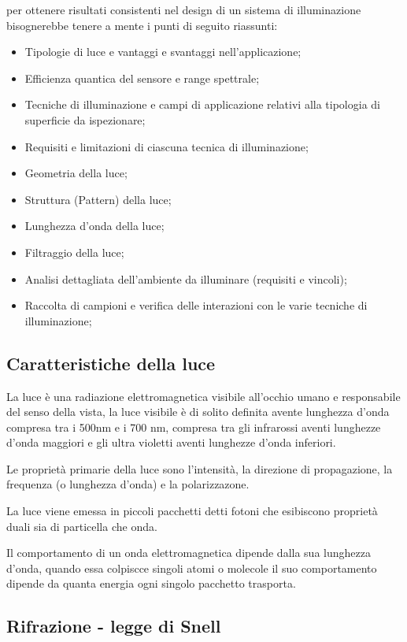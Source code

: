 per ottenere risultati consistenti nel design di un sistema di illuminazione bisognerebbe tenere a mente i punti di seguito riassunti:

\begin{itemize}
	\item Tipologie di luce e vantaggi e svantaggi nell'applicazione;
	\item Efficienza quantica del sensore e range spettrale;
	\item Tecniche di illuminazione e campi di applicazione relativi alla tipologia di superficie da ispezionare;
	\item Requisiti e limitazioni di ciascuna tecnica di illuminazione;
	\item Geometria della luce;
	\item Struttura (Pattern) della luce;
	\item Lunghezza d'onda della luce;
	\item Filtraggio della luce;
	\item Analisi dettagliata dell'ambiente da illuminare (requisiti e vincoli);
	\item Raccolta di campioni e verifica delle interazioni con le varie tecniche di illuminazione;
\end{itemize}

\subsection{Caratteristiche della luce}

La luce è una radiazione elettromagnetica visibile all'occhio umano e responsabile del senso della vista,
la luce visibile è di solito definita avente lunghezza d'onda compresa tra i 500nm e i 700 nm, compresa tra gli infrarossi aventi lunghezze d'onda maggiori e gli ultra violetti aventi lunghezze d'onda inferiori.

Le proprietà primarie della luce sono l'intensità, la direzione di propagazione, la frequenza (o lunghezza d'onda) e la polarizzazone.

La luce viene emessa in piccoli pacchetti detti fotoni che esibiscono proprietà duali sia di particella che onda.

Il comportamento di un onda elettromagnetica dipende dalla sua lunghezza d'onda, quando essa colpiscce singoli atomi o molecole il suo comportamento dipende da quanta energia ogni singolo pacchetto trasporta.

\subsection{Rifrazione - legge di Snell}

